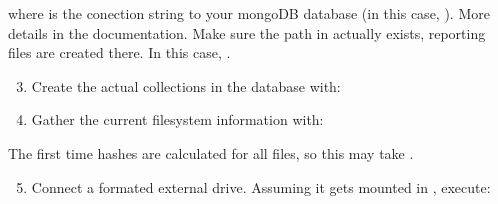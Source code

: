 \documentclass[letterpaper,10pt,english]{sphinxmanual}
\begin{document}
where  is the conection string to your mongoDB database (in this case, ). More details in the documentation.
Make sure the path in  actually exists, reporting files are created there. In this case,
.
\begin{enumerate}
\setcounter{enumi}{2}
\item {} 
Create the actual collections in the database with:

\begin{sphinxVerbatim}[commandchars=\\\{\}]
   
\end{sphinxVerbatim}

\item {} 
Gather the current filesystem information with:

\begin{sphinxVerbatim}[commandchars=\\\{\}]
  
\end{sphinxVerbatim}

\end{enumerate}

The first time hashes are calculated for all files, so this may take .
\begin{enumerate}
\setcounter{enumi}{4}
\item {} 
Connect a formated external drive. Assuming it gets mounted in , execute:

\begin{sphinxVerbatim}[commandchars=\\\{\}]
   
\end{sphinxVerbatim}

\end{enumerate}
\end{document}
